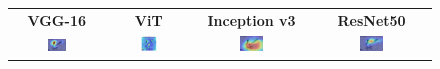 \documentclass[a4paper,12pt]{report}
\begin{document}
\begin{figure}[H]
    \centering
    \setlength{\tabcolsep}{1pt}
    \begin{tabular}{cccc}
    \textbf{VGG-16} & \textbf{ViT} & \textbf{Inception v3} & \textbf{ResNet50} \\
    
    \includegraphics[width=0.22\textwidth]{images/appendix/modelgraph/vgg/correct/Slaty_Backed_Gull/480 (1).jpeg} &
    \includegraphics[width=0.22\textwidth]{images/appendix/modelgraph/vit/correct/Slaty_Backed_Gull/480 (1).jpeg} &
    \includegraphics[width=0.22\textwidth]{images/appendix/modelgraph/inception/correct/Slaty_Backed_Gull/480 (1).jpeg} &
    \includegraphics[width=0.22\textwidth]{images/appendix/modelgraph/resnet/correct/Slaty_Backed_Gull/480 (1).jpeg} \\
    \end{tabular}

    \label{fig:interpretability_slaty_5}
\end{figure}
\end{document}
